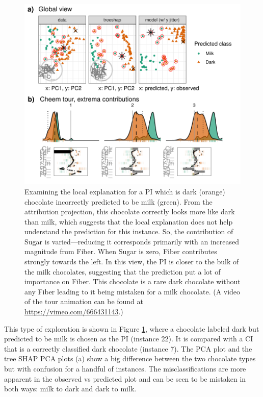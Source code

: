 \documentclass[11pt,twoside]{article}
\begin{document}
\begin{figure}

{\centering \includegraphics[width=1\linewidth]{./figures/case_chocolates} 

}

\caption{Examining the local explanation for a PI which is dark (orange) chocolate incorrectly predicted to be milk (green). From the attribution projection, this chocolate correctly looks more like dark than milk, which suggests that the local explanation does not help understand the prediction for this instance. So, the contribution of Sugar is varied---reducing it corresponds primarily with an increased magnitude from Fiber. When Sugar is zero, Fiber contributes strongly towards the left. In this view, the PI is closer to the bulk of the milk chocolates, suggesting that the prediction put a lot of importance on Fiber. This chocolate is a rare dark chocolate without any Fiber leading to it being mistaken for a milk chocolate. (A video of the tour animation can be found at \url{https://vimeo.com/666431143}.)}\label{fig:casechocolates}
\end{figure}

This type of exploration is shown in Figure \ref{fig:casechocolates}, where a chocolate labeled dark but predicted to be milk is chosen as the PI (instance 22). It is compared with a CI that is a correctly classified dark chocolate (instance 7). The PCA plot and the tree SHAP PCA plots (a) show a big difference between the two chocolate types but with confusion for a handful of instances. The misclassifications are more apparent in the observed vs predicted plot and can be seen to be mistaken in both ways: milk to dark and dark to milk.
\end{document}

